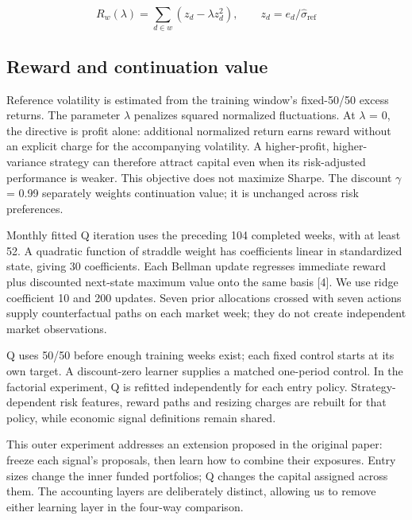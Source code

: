 \documentclass[11pt,letterpaper]{article}
\begin{document}
\[R_w(\lambda)=\sum_{d\in w}(z_d-\lambda z_d^2),\qquad z_d=e_d/\widehat{\sigma}_{\mathrm{ref}}\]
\subsection*{Reward and continuation value}
Reference volatility is estimated from the training window's fixed-50/50 excess returns. The parameter \ensuremath{\lambda} penalizes squared normalized fluctuations. At \ensuremath{\lambda} = 0, the directive is profit alone: additional normalized return earns reward without an explicit charge for the accompanying volatility. A higher-profit, higher-variance strategy can therefore attract capital even when its risk-adjusted performance is weaker. This objective does not maximize Sharpe. The discount \ensuremath{\gamma} = 0.99 separately weights continuation value; it is unchanged across risk preferences.

Monthly fitted Q iteration uses the preceding 104 completed weeks, with at least 52. A quadratic function of straddle weight has coefficients linear in standardized state, giving 30 coefficients. Each Bellman update regresses immediate reward plus discounted next-state maximum value onto the same basis [4]. We use ridge coefficient 10 and 200 updates. Seven prior allocations crossed with seven actions supply counterfactual paths on each market week; they do not create independent market observations.

Q uses 50/50 before enough training weeks exist; each fixed control starts at its own target. A discount-zero learner supplies a matched one-period control. In the factorial experiment, Q is refitted independently for each entry policy. Strategy-dependent risk features, reward paths and resizing charges are rebuilt for that policy, while economic signal definitions remain shared.

This outer experiment addresses an extension proposed in the original paper: freeze each signal's proposals, then learn how to combine their exposures. Entry sizes change the inner funded portfolios; Q changes the capital assigned across them. The accounting layers are deliberately distinct, allowing us to remove either learning layer in the four-way comparison.

\clearpage
\end{document}
